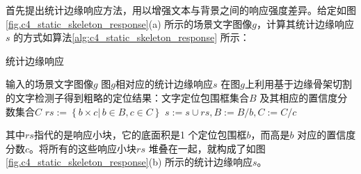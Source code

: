         首先提出统计边缘响应方法，用以增强文本与背景之间的响应强度差异。给定如图\ref{fig.c4_static_skeleton_response}(a) 所示的场景文字图像$g$，计算其统计边缘响应$s$ 的方式如算法\ref{alg:c4_static_skeleton_response} 所示：

        \begin{algorithm} \renewcommand{\algorithmicrequire}{\textbf{输入:}}	\renewcommand{\algorithmicensure}{\textbf{输出:}}
    	\caption{统计边缘响应}
    	\label{alg:c4_static_skeleton_response}
    	\begin{algorithmic}[1]
    		\REQUIRE 输入的场景文字图像$g$
    		\ENSURE 图$g$相对应的统计边缘响应$s$
            \STATE 在图$g$上利用基于边缘骨架切割的文字检测子得到粗略的定位结果：文字定位包围框集合$B$ 及其相应的置信度分数集合$C$
    		\REPEAT
            \STATE $rs:=\left\{ b \times c  |\,b \in B, c \in C\right\}$
            \STATE $s:=s\cup rs,B:=B / b,C:=C / c$
    	\end{algorithmic}
        \end{algorithm}

        其中$rs$指代的是响应小块，它的底面积是1 个定位包围框$b$，而高是$b$ 对应的置信度分数$c$。将所有的这些响应小块$rs$ 堆叠在一起，就构成了如图\ref{fig.c4_static_skeleton_response}(b) 所示的统计边缘响应$s$。

